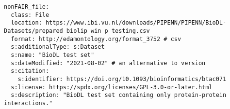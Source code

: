 \begin{verbatim}
nonFAIR_file:
  class: File
  location: https://www.ibi.vu.nl/downloads/PIPENN/PIPENN/BioDL-Datasets/prepared_biolip_win_p_testing.csv
  format: http://edamontology.org/format_3752 # csv
  s:additionalType: s:Dataset 
  s:name: "BioDL test set"
  s:dateModified: "2021-08-02" # an alternative to version
  s:citation:
    s:identifier: https://doi.org/10.1093/bioinformatics/btac071
  s:license: https://spdx.org/licenses/GPL-3.0-or-later.html
  s:description: "BioDL test set containing only protein-protein interactions."
\end{verbatim}